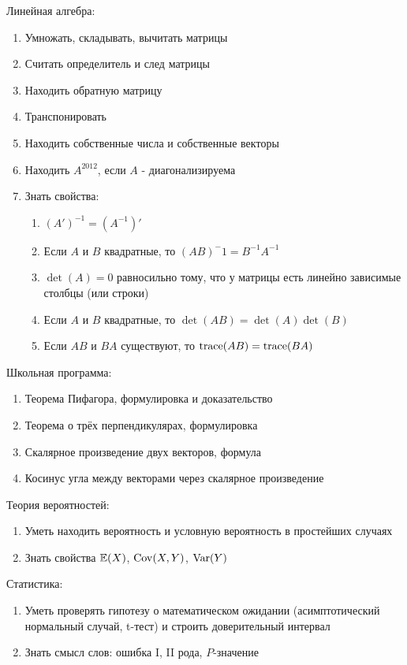 \documentclass[12pt, a4paper]{article}\usepackage[]{graphicx}\usepackage[]{color}
\begin{document}
Линейная алгебра:
\begin{enumerate}
\item Умножать, складывать, вычитать матрицы
\item Считать определитель и след матрицы
\item Находить обратную матрицу
\item Транспонировать
\item Находить собственные числа и собственные векторы
\item Находить $A^{2012}$, если $A$ - диагонализируема
\item Знать свойства:
\begin{enumerate}
\item $(A')^{-1}=(A^{-1})'$
\item Если $A$ и $B$ квадратные, то $(AB)^-1=B^{-1}A^{-1}$
\item $\det(A)=0$ равносильно тому, что у матрицы есть линейно зависимые столбцы (или строки)
\item Если $A$ и $B$ квадратные, то $\det(AB)=\det(A)\det(B)$
\item Если $AB$ и $BA$ существуют, то $\operatorname{trace}(AB)=\operatorname{trace}(BA)$
\end{enumerate}
\end{enumerate}

Школьная программа:
\begin{enumerate}
\item Теорема Пифагора, формулировка и доказательство
\item Теорема о трёх перпендикулярах, формулировка
\item Скалярное произведение двух векторов, формула
\item Косинус угла между векторами через скалярное произведение
\end{enumerate}

Теория вероятностей:
\begin{enumerate}
\item  Уметь находить вероятность и условную вероятность в простейших случаях
\item Знать свойства $\mathbb{E}(X)$, $\operatorname{Cov}(X,Y)$, $\operatorname{Var}(Y)$
\end{enumerate}

Статистика:
\begin{enumerate}
\item  Уметь проверять гипотезу о математическом ожидании (асимптотический нормальный случай, t-тест) и строить доверительный интервал
\item Знать смысл слов: ошибка I, II рода, $P$-значение
\end{enumerate}
\end{document}
